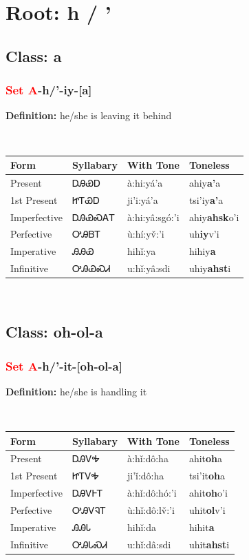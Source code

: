 \needspace{4in}
\section*{Root: h / '}
\nopagebreak
{}
\needspace{3in}
\subsection*{Class: a}
\nopagebreak
\needspace{2in}
\subsubsection*{\textcolor{Red}{Set A}{-}\textbf{h/'}{-}iy{-}[a]}
\nopagebreak
\textbf{Definition: } he/she is leaving it behind
\\[0.5em]
\begin{tabularx}{\textwidth}{l X X X}%
\toprule%
\textbf{Form}&\textbf{Syllabary}&\textbf{With Tone}&\textbf{Toneless}\\%
\midrule%
Present&ᎠᎯᏯᎠ&à:hi:yá’a&ahiy\textbf{a'}a\\%
1st Present&ᏥᎢᏯᎠ&ji’i:yá’a&tsi'iy\textbf{a'}a\\%
Imperfective&ᎠᎯᏯᏍᎪᎢ&à:hi:yâ:sgó:’i&ahiy\textbf{ahsk}o'i\\%
Perfective&ᎤᎯᏴᎢ&ù:hí:yv̌:’i&uh\textbf{iy}v'i\\%
Imperative&ᎯᎯᏯ&hihǐ:ya&hihiy\textbf{a}\\%
Infinitive&ᎤᎯᏯᏍᏗ&u:hǐ:yâ:sdi&uhiy\textbf{ahst}i\\%
\bottomrule%
\end{tabularx}
\\[1em]
\needspace{3in}
\subsection*{Class: oh-ol-a}
\nopagebreak
\needspace{2in}
\subsubsection*{\textcolor{Red}{Set A}{-}\textbf{h/'}{-}it{-}[oh-ol-a]}
\nopagebreak
\textbf{Definition: } he/she is handling it
\\[0.5em]
\begin{tabularx}{\textwidth}{l X X X}%
\toprule%
\textbf{Form}&\textbf{Syllabary}&\textbf{With Tone}&\textbf{Toneless}\\%
\midrule%
Present&ᎠᎯᏙᎭ&à:hǐ:dô:ha&ahit\textbf{oh}a\\%
1st Present&ᏥᎢᏙᎭ&ji’ǐ:dô:ha&tsi'it\textbf{oh}a\\%
Imperfective&ᎠᎯᏙᎰᎢ&à:hǐ:dô:hó:’i&ahit\textbf{oh}o'i\\%
Perfective&ᎤᎯᏙᎸᎢ&ù:hǐ:dô:lv̌:’i&uhit\textbf{ol}v'i\\%
Imperative&ᎯᎯᏓ&hihǐ:da&hihit\textbf{a}\\%
Infinitive&ᎤᎯᏓᏍᏗ&u:hǐ:dâ:sdi&uhit\textbf{ahst}i\\%
\bottomrule%
\end{tabularx}
\\[1em]
\needspace{3in}
